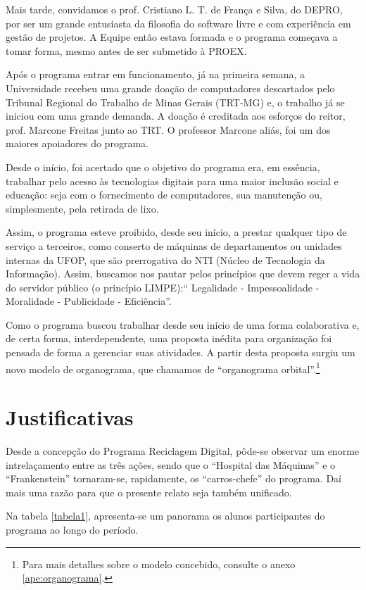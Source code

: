 \documentclass[
	12pt,				%
	openright,			%
	oneside,			%
	a4paper,			%
	english,			%
	spanish,			%
	brazil,				%
	]{abntex2}
\begin{document}
Mais tarde, convidamos o prof. Cristiano L. T. de França e Silva, do DEPRO, por ser um grande entusiasta da filosofia do software livre e com experiência em gestão de projetos. A Equipe então estava formada e o programa começava a tomar forma, mesmo antes de ser submetido à PROEX.

Após o programa entrar em funcionamento, já na primeira semana, a Universidade recebeu uma grande doação de computadores descartados pelo Tribunal Regional do Trabalho de Minas Gerais (TRT-MG) e, o trabalho já se iniciou com uma grande demanda. A doação é creditada aos esforços do reitor, prof. Marcone Freitas junto ao TRT. O professor Marcone aliás, foi um dos maiores apoiadores do programa.

Desde o início, foi acertado que o objetivo do programa era, em essência, trabalhar pelo acesso às tecnologias digitais para uma maior inclusão social e educação: seja com o fornecimento de computadores, sua manutenção ou, simplesmente, pela retirada de lixo.

Assim, o programa esteve proibido, desde seu início, a prestar qualquer tipo de serviço a terceiros, como conserto de máquinas de departamentos ou unidades internas da UFOP, que são prerrogativa do NTI (Núcleo de Tecnologia da Informação). Assim, buscamos nos pautar pelos princípios que devem reger a vida do servidor público (o princípio LIMPE):`` Legalidade - Impessoalidade - Moralidade - Publicidade - Eficiência''.

Como o programa buscou trabalhar desde seu início de uma forma colaborativa e, de certa forma, interdependente, uma proposta inédita para organização foi pensada de forma a gerenciar suas atividades. A partir desta proposta surgiu um novo modelo de organograma, que chamamos de ``organograma orbital''.\footnote{Para mais detalhes sobre o modelo concebido, consulte o anexo \ref{ape:organograma}.}


\section{Justificativas}

Desde a concepção do Programa Reciclagem Digital, pôde-se observar um enorme intrelaçamento entre as três ações, sendo que o ``Hospital das Máquinas'' e o ``Frankenstein'' tornaram-se, rapidamente, os ``carros-chefe'' do programa. Daí mais uma razão para que o presente relato seja também unificado.


Na tabela \ref{tabela1}, apresenta-se um panorama os alunos participantes do programa ao longo do período.
\end{document}
